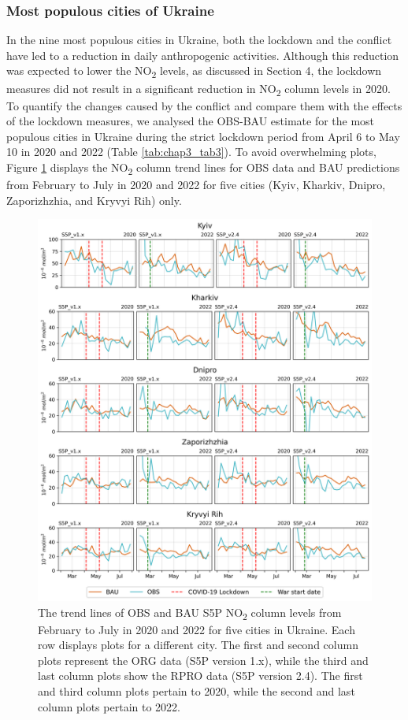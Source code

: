 \subsubsection*{Most populous cities of Ukraine}
In the nine most populous cities in Ukraine, both the lockdown and the conflict have led to a reduction in daily anthropogenic activities. Although this reduction was expected to lower the NO\textsubscript{2} levels, as discussed in Section 4, the lockdown measures did not result in a significant reduction in NO\textsubscript{2} column levels in 2020. To quantify the changes caused by the conflict and compare them with the effects of the lockdown measures, we analysed the OBS-BAU estimate for the most populous cities in Ukraine during the strict lockdown period from April 6 to May 10 in 2020 and 2022 (Table \ref{tab:chap3_tab3}). To avoid overwhelming plots, Figure \ref{fig:chap3_fig8} displays the NO\textsubscript{2} column trend lines for OBS data and BAU predictions from February to July in 2020 and 2022 for five cities (Kyiv, Kharkiv, Dnipro, Zaporizhzhia, and Kryvyi Rih) only.\par
\begin{figure}[p]
    \centering
    \includegraphics[width=\textwidth]{figs/chap3/fig8.png}
    \caption[OBS and BAU S5P NO\textsubscript{2} trends (2020-2022) in populous cities]{The trend lines of OBS and BAU S5P NO\textsubscript{2} column levels from February to July in 2020 and 2022 for five cities in Ukraine. Each row displays plots for a different city. The first and second column plots represent the ORG data (S5P version 1.x), while the third and last column plots show the RPRO data (S5P version 2.4). The first and third column plots pertain to 2020, while the second and last column plots pertain to 2022.}
    \label{fig:chap3_fig8}
\end{figure}


